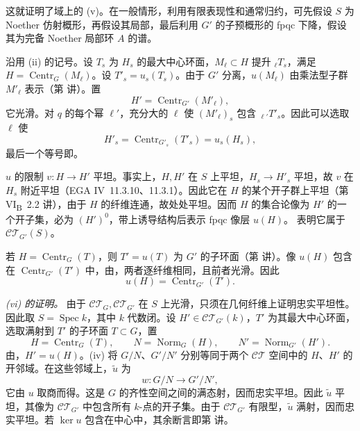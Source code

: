 这就证明了域上的 (v)。在一般情形，利用有限表现性和通常归约，可先假设 \(S\) 为 Noether 仿射概形，再假设其局部，最后利用 \(G'\) 的子预概形的 fpqc 下降，假设其为完备 Noether 局部环 \(A\) 的谱。

沿用 (ii) 的记号。设 \(T_s\) 为 \(H_s\) 的最大中心环面，\(M_\ell\subset H\) 提升 \({}_\ell T_s\)，满足 \(H=\operatorname{Centr}_G(M_\ell)\)。设 \(T'_s=u_s(T_s)\)。由于 \(G'\) 分离，\(u(M_\ell)\) 由乘法型子群 \(M'_\ell\) 表示（第  讲）。置
\[
  H'=\operatorname{Centr}_{G'}(M'_\ell),
\]
它光滑。对 \(q\) 的每个幂 \(\ell'\)，充分大的 \(\ell\) 使 \((M'_\ell)_s\) 包含 \({}_{\ell'}T'_s\)。因此可以选取 \(\ell\) 使
\[
 H'_s=\operatorname{Centr}_{G'_s}(T'_s)=u_s(H_s),
\]
最后一个等号即。

\(u\) 的限制 \(v:H\to H'\) 平坦。事实上，\(H,H'\) 在 \(S\) 上平坦，\(H_s\to H'_s\) 平坦，故 \(v\) 在 \(H_s\) 附近平坦（EGA IV~11.3.10、11.3.1）。因此它在 \(H\) 的某个开子群上平坦（第 VI\textsubscript{B}~2.2 讲），由于 \(H\) 的纤维连通，故处处平坦。因而 \(H\) 的集合论像为 \(H'\) 的一个开子集，必为 \((H')^0\)，带上诱导结构后表示 fpqc 像层 \(u(H)\)。 表明它属于 \(\mathcal{CT}_{G'}(S)\)。

若 \(H=\operatorname{Centr}_G(T)\)，则 \(T'=u(T)\) 为 \(G'\) 的子环面（第  讲）。像 \(u(H)\) 包含在 \(\operatorname{Centr}_{G'}(T')\) 中，由，两者逐纤维相同，且前者光滑。因此
\[
  u(H)=\operatorname{Centr}_{G'}(T').
\]

\medskip\noindent\textit{(vi) 的证明。}
由于 \(\mathcal{CT}_G,\mathcal{CT}_{G'}\) 在 \(S\) 上光滑，只须在几何纤维上证明忠实平坦性。因此取 \(S=\operatorname{Spec}k\)，其中 \(k\) 代数闭。设 \(H'\in\mathcal{CT}_{G'}(k)\)，\(T'\) 为其最大中心环面，选取满射到 \(T'\) 的子环面 \(T\subset G\)，置
\[
 H=\operatorname{Centr}_G(T),\qquad
 N=\operatorname{Norm}_G(H),\qquad
 N'=\operatorname{Norm}_{G'}(H').
\]
由，\(H'=u(H)\)。(iv) 将 \(G/N\)、\(G'/N'\) 分别等同于两个 \(\mathcal{CT}\) 空间中的 \(H\)、\(H'\) 的开邻域。在这些邻域上，\(\widetilde u\) 为
\[
  w:G/N\longrightarrow G'/N',
\]
它由 \(u\) 取商而得。这是 \(G\) 的齐性空间之间的满态射，因而忠实平坦。因此 \(\widetilde u\) 平坦，其像为 \(\mathcal{CT}_{G'}\) 中包含所有 \(k\)-点的开子集。由于 \(\mathcal{CT}_{G'}\) 有限型，\(\widetilde u\) 满射，因而忠实平坦。若 \(\ker u\) 包含在中心中，其余断言即第  讲。

